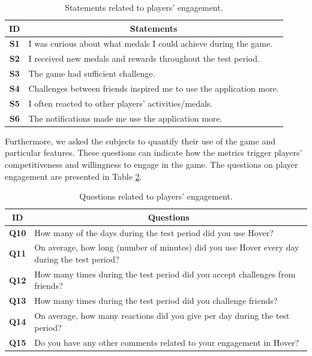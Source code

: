 \begin{table}[H]
    \centering
    \begin{tabularx}{0.95\textwidth}{|c|X|}
        \hline
        \textbf{ID} & \multicolumn{1}{c|}{\textbf{Statements}} \\ \hline
        \textbf{S1} & I was curious about what medals I could achieve during the game. \\
        \textbf{S2} & I received new medals and rewards throughout the test period. \\
        \textbf{S3} & The game had sufficient challenge. \\
        \textbf{S4} & Challenges between friends inspired me to use the application more. \\
        \textbf{S5} & I often reacted to other players' activities/medals. \\
        \textbf{S6} & The notifications made me use the application more. \\ \hline
    \end{tabularx}
    \caption{Statements related to players' engagement.}
    \label{tab:player_engagement_statements}
\end{table}

Furthermore, we asked the subjects to quantify their use of the game and particular features. These questions can indicate how the metrics trigger players’ competitiveness and willingness to engage in the game. The questions on player engagement are presented in Table \ref{tab:player_engagement_questions}.

\begin{table}[H]
    \centering
    \begin{tabularx}{0.95\textwidth}{|c|X|}
        \hline
        \textbf{ID} & \multicolumn{1}{c|}{\textbf{Questions}} \\ \hline
        \textbf{Q10} & How many of the days during the test period did you use Hover? \\
        \textbf{Q11} & On average, how long (number of minutes) did you use Hover every day during the test period? \\
        \textbf{Q12} & How many times during the test period did you accept challenges from friends? \\
        \textbf{Q13} & How many times during the test period did you challenge friends? \\
        \textbf{Q14} & On average, how many reactions did you give per day during the test period? \\
        \textbf{Q15} & Do you have any other comments related to your engagement in Hover? \\ \hline
    \end{tabularx}
    \caption{Questions related to players' engagement.}
    \label{tab:player_engagement_questions}
\end{table}

